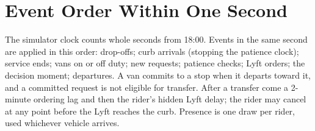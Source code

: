 \documentclass{article}
\begin{document}
\section{Event Order Within One Second}\label{app:order}
The simulator clock counts whole seconds from 18:00. Events in the same second are applied in this order: drop-offs; curb arrivals (stopping the patience clock); service ends; vans on or off duty; new requests; patience checks; Lyft orders; the decision moment; departures. A van commits to a stop when it departs toward it, and a committed request is not eligible for transfer. After a transfer come a 2-minute ordering lag and then the rider's hidden Lyft delay; the rider may cancel at any point before the Lyft reaches the curb. Presence is one draw per rider, used whichever vehicle arrives.
\end{document}
